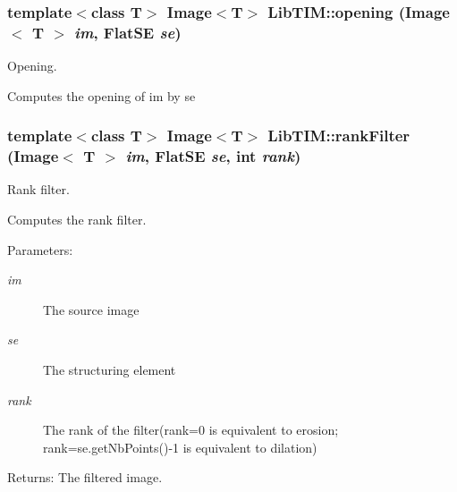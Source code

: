 \subsubsection{\setlength{\rightskip}{0pt plus 5cm}template$<$class T$>$ Image$<$T$>$ Lib\-TIM::opening (Image$<$ T $>$ {\em im}, Flat\-SE {\em se})}\label{group__basisFunctions_ga6}


Opening. 

Computes the opening of im by se
\subsubsection{\setlength{\rightskip}{0pt plus 5cm}template$<$class T$>$ Image$<$T$>$ Lib\-TIM::rank\-Filter (Image$<$ T $>$ {\em im}, Flat\-SE {\em se}, int {\em rank})}\label{group__basisFunctions_ga11}


Rank filter. 

Computes the rank filter. \begin{Desc}
\item[Parameters:]
\begin{description}
\item[{\em im}]The source image \item[{\em se}]The structuring element \item[{\em rank}]The rank of the filter(rank=0 is equivalent to erosion; rank=se.get\-Nb\-Points()-1 is equivalent to dilation) \end{description}
\end{Desc}
\begin{Desc}
\item[Returns:]The filtered image.\end{Desc}
